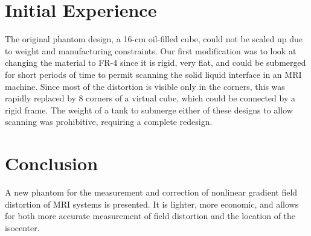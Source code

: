 \section{Initial Experience}

The original phantom design, a 16-cm oil-filled cube, could not be scaled up due to weight and manufacturing 
constraints. Our first modification was to look at changing the material to FR-4 since it is rigid, very flat, 
and could be submerged for short periods of time to permit scanning the solid liquid interface in an MRI 
machine.  Since most of the distortion is visible only in the corners, this was rapidly replaced by 8 corners 
of a virtual cube, which could be connected by a rigid frame.  The weight of a tank to submerge either of 
these designs to allow scanning was prohibitive, requiring a complete redesign.

\section{Conclusion}

A new phantom for the measurement and correction of nonlinear gradient field distortion of MRI systems is 
presented.  It is lighter, more economic, and allows for both more accurate measurement of field distortion 
and the location of the isocenter. 
